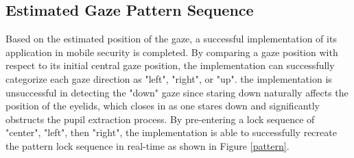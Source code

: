 \documentclass[10pt,twocolumn,letterpaper]{article}
\begin{document}
\subsection{Estimated Gaze Pattern Sequence}
Based on the estimated position of the gaze, a successful implementation of its application in mobile security is completed.  By comparing a gaze position with respect to its initial central gaze position, the implementation can successfully categorize each gaze direction as "left", "right", or "up".  the implementation is unsuccessful in detecting the "down" gaze since staring down naturally affects the position of the eyelids, which closes in as one stares down and significantly obstructs the pupil extraction process.  By pre-entering a lock sequence of "center", "left", then "right", the implementation is able to successfully recreate the pattern lock sequence in real-time as shown in Figure \ref{pattern}.  
\end{document}
